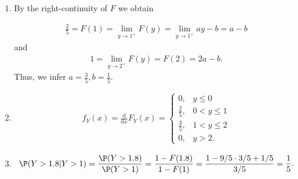 \begin{solution}

\phantom{}

\begin{enumerate}[label = (\alph*)]

\item By the right-continuity of $F$ we obtain

\begin{align*}
  \frac{2}{5} = F(1) = \lim_{y \to 1^+} F(y) =
  \lim_{y \to 1^+} ay - b = a - b
\end{align*}
and
\begin{align*}
  1 = \lim_{y \to 2^+} F(y) = F(2) = 2a - b.
\end{align*}
Thus, we infer $a = \frac{3}{5}, b = \frac{1}{5}$.

\item

\begin{align*}
  f_Y(x) = \frac{\mathrm{d}}{\mathrm{d}x}F_Y(x)
  = \begin{cases}
    0, & y \leq 0 \\
    \frac{2}{5}, & 0 < y \leq 1 \\
    \frac{3}{5}, & 1 < y \leq 2 \\
    0, & y > 2.
  \end{cases}
\end{align*}

\item

\begin{align*}
  \P(Y > 1.8 | Y > 1) = \frac{\P(Y > 1.8)}{\P(Y > 1)}
  = \frac{1 - F(1.8)}{1 - F(1)}
  = \frac{1 - 9/5\cdot3/5 + 1/5}{3/5}
  = \frac{1}{5}.
\end{align*}

\end{enumerate}

\end{solution}

